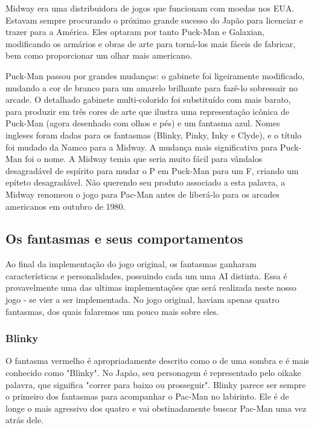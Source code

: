 \begin{multicols}{2}

Midway era uma distribuidora de jogos que funcionam com moedas nos EUA. Estavam sempre procurando o próximo grande sucesso do Japão para licenciar e trazer para a América. Eles optaram por tanto Puck-Man e Galaxian, modificando os armários e obras de arte para torná-los mais fáceis de fabricar, bem como proporcionar um olhar mais americano.

Puck-Man passou por grandes mudanças: o gabinete foi ligeiramente modificado, mudando a cor de branco para um amarelo brilhante para fazê-lo sobressair no arcade. O detalhado gabinete multi-colorido foi substituído com mais barato, para produzir em três cores de arte que ilustra uma representação icônica de Puck-Man (agora desenhado com olhos e pés) e um fantasma azul. Nomes ingleses foram dadas para os fantasmas (Blinky, Pinky, Inky e Clyde), e o título foi mudado da Namco para  a Midway. A mudança mais significativa para Puck-Man foi o nome. A Midway temia que seria muito fácil para vândalos desagradável de espírito para mudar o P em Puck-Man para um F, criando um epíteto desagradável. Não querendo seu produto associado a esta palavra, a Midway renomeou o jogo para Pac-Man antes de liberá-lo para os arcades americanos em outubro de 1980.\cite{dossier}

\subsection{Os fantasmas e seus comportamentos}\label{desafios}

Ao final da implementação do jogo original, os fantasmas ganharam características e personalidades, possuindo cada um uma AI distinta. Essa é provavelmente uma das ultimas implementações que será realizada neste nosso jogo - se vier a ser implementada. No jogo original, haviam apenas quatro fantasmas, dos quais falaremos um pouco mais sobre eles.

\subsubsection{Blinky}\label{blinky}

O fantasma vermelho é apropriadamente descrito como o de uma sombra e é mais conhecido como "Blinky". No Japão, seu personagem é representado pelo oikake palavra, que significa "correr para baixo ou prosseguir". Blinky parece ser sempre o primeiro dos fantasmas para acompanhar o Pac-Man no labirinto. Ele é de longe o mais agressivo dos quatro e vai obstinadamente buscar Pac-Man uma vez atrás dele.


\end{multicols}
